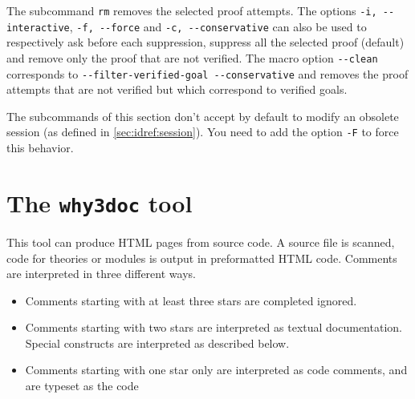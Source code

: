 The subcommand \texttt{rm} removes the selected proof
attempts. The options \verb|-i, --interactive|, \verb|-f, --force| and
\verb|-c, --conservative| can also be used to respectively ask before
each suppression, suppress all the selected proof (default) and remove
only the proof that are not verified. The macro option \verb|--clean|
corresponds to \verb|--filter-verified-goal --conservative| and
removes the proof attempts that are not verified but which correspond
to verified goals.

The subcommands of this section don't accept by default to modify an
obsolete session (as defined in \ref{sec:idref:session}). You need to
add the option \verb|-F| to force this behavior.






\section{The \texttt{why3doc} tool}
\label{sec:why3doc}

This tool can produce HTML pages from \why source code. A source file
is scanned, \why code for theories or modules is output in
preformatted HTML code. Comments are interpreted in three different ways.
\begin{itemize}
\item Comments starting with at least three stars are completed
  ignored.
\item Comments starting with two stars are interpreted as textual
  documentation. Special constructs are interpreted as described
  below.
\item Comments starting with one star only are interpreted as code
  comments, and are typeset as the code
\end{itemize}

